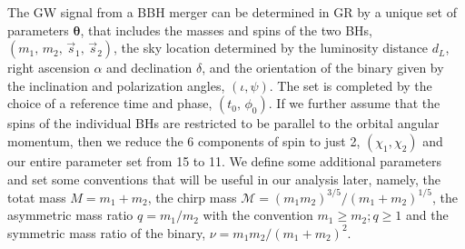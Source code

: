 \documentclass[twocolumn,prd,aps,superscriptaddress,preprintnumbers,tightenlines,showpacs,nofootinbib,amsfonts,amsmath,longbibliography]{revtex4-1}
\begin{document}
The GW signal from a BBH merger can be determined in GR by a unique set of parameters $\bm{\theta}$, that
includes the masses and spins of the two BHs, $(m_1,\, m_2,\, \vec{s}_1,\, \vec{s}_2)$, the sky location determined by the luminosity distance $d_L$, right ascension $\alpha$ and declination $\delta$, and the orientation of the binary given by the inclination and polarization angles, $(\iota, \psi)$. The set is completed by the choice of a reference time and phase, $(t_0,\, \phi_0)$. If we further assume that the spins of the individual BHs are restricted to be parallel to the orbital angular momentum, then we reduce the 6 components of spin to just 2, $(\chi_1, \chi_2)$ and our entire parameter set from 15 to 11. We define some additional parameters and set some conventions that will be useful in our analysis later, namely, the totat mass $M=m_1+m_2$, the chirp mass $\mathcal {M}=(m_{1}m_{2})^{3/5}/(m_{1}+m_{2})^{1/5}$, the asymmetric mass ratio $q=m_1/m_2$ with the convention $m_1 \geqslant m_2; q \geqslant 1$ and the symmetric mass ratio of the binary, $\nu = m_1m_2/(m_1+m_2)^2$.
\end{document}
